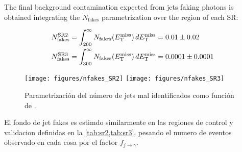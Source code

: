The final background contamination expected from jets faking photons is obtained integrating the $N_\text{fakes}$ parametrization over the \met region
of each SR:

\begin{align}
  N_\text{fakes}^\text{SR2} &= \int_{200}^{\infty} N_\text{fakes}(E_{\mathrm{T}}^{\mathrm{miss}}) \, dE_{\mathrm{T}}^{\mathrm{miss}} = 0.01 \pm 0.02 \\
  N_\text{fakes}^\text{SR3} &= \int_{300}^{\infty} N_\text{fakes}(E_{\mathrm{T}}^{\mathrm{miss}}) \, dE_{\mathrm{T}}^{\mathrm{miss}} = 0.0001 \pm 0.0001
\end{align}


\begin{figure}[h]
  \centering
  \texttt{[image: figures/nfakes\_SR2]}  \hfill
  \texttt{[image: figures/nfakes\_SR3]}
  \caption{Parametrización del número de jets mal identificados como
    función de {\met}.}
  \label{fig:jetfake_nfakes_met}
\end{figure}

El fondo de jet fakes es estimdo similarmente en las regiones de control
y validacion definidas en la \cref{tab:sr2,tab:sr3}, pesando
el numero de eventos observado en cada cosa por el factor $f_{j\to\gamma}$. %









